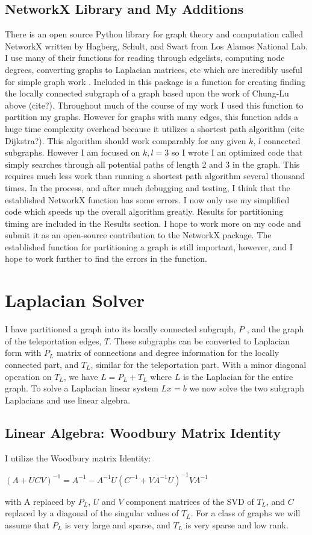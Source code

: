 \documentclass{article}
\begin{document}
\subsection{NetworkX Library and My Additions}
There is an open source Python library for graph theory and computation called NetworkX written by Hagberg, Schult, and Swart from Los Alamos National Lab. I use many of their functions for reading through edgelists, computing node degrees, converting graphs to Laplacian matrices, etc which are incredibly useful for simple graph work \cite{Hagberg:2008}. Included in this package is a function for creating finding the locally connected subgraph of a graph based upon the work of Chung-Lu above (cite?). Throughout much of the course of my work I used this function to partition my graphs. However for graphs with many edges, this function adds a huge time complexity overhead because it utilizes a shortest path algorithm (cite Dijkstra?). This algorithm should work comparably for any given $k$, $l$ connected subgraphs. However I am focused on $k,l = 3$ so I wrote I an optimized code that simply searches through all potential paths of length 2 and 3 in the graph. This requires much less work than running a shortest path algorithm several thousand times. In the process, and after much debugging and testing, I think that the established NetworkX function has some errors. I now only use my simplified code which speeds up the overall algorithm greatly. Results for partitioning timing are included in the Results section. I hope to work more on my code and submit it as an open-source contribution to the NetworkX package. The established function for partitioning a graph is still important, however, and I hope to work further to find the errors in the function.

\section{Laplacian Solver}
I have partitioned a graph into its locally connected subgraph, $P$ , and the graph of the teleportation edges, $T$. These subgraphs can be converted to Laplacian form with $P_L$ matrix of connections and degree information for the locally connected part, and $T_L$, similar for the teleportation part. With a minor diagonal operation on $T_L$, we have $L = P_L + T_L$ where $L$ is the Laplacian for the entire graph. To solve a Laplacian linear system $Lx=b$ we now solve the two subgraph Laplacians and use linear algebra.

\subsection{Linear Algebra: Woodbury Matrix Identity}
I utilize the Woodbury matrix Identity:\\
\begin{center}
$(A+UCV)^{-1} = A^{-1} - A^{-1}U(C^{-1}+VA^{-1}U)^{-1}VA^{-1}$\\
\end{center}
with A replaced by $P_L$, $U$ and $V$ component matrices of the SVD of $T_L$, and $C$ replaced by a diagonal of the singular values of $T_L$. For a class of graphs we will assume that $P_L$ is very large and sparse, and $T_L$ is very sparse and low rank.
\end{document}
